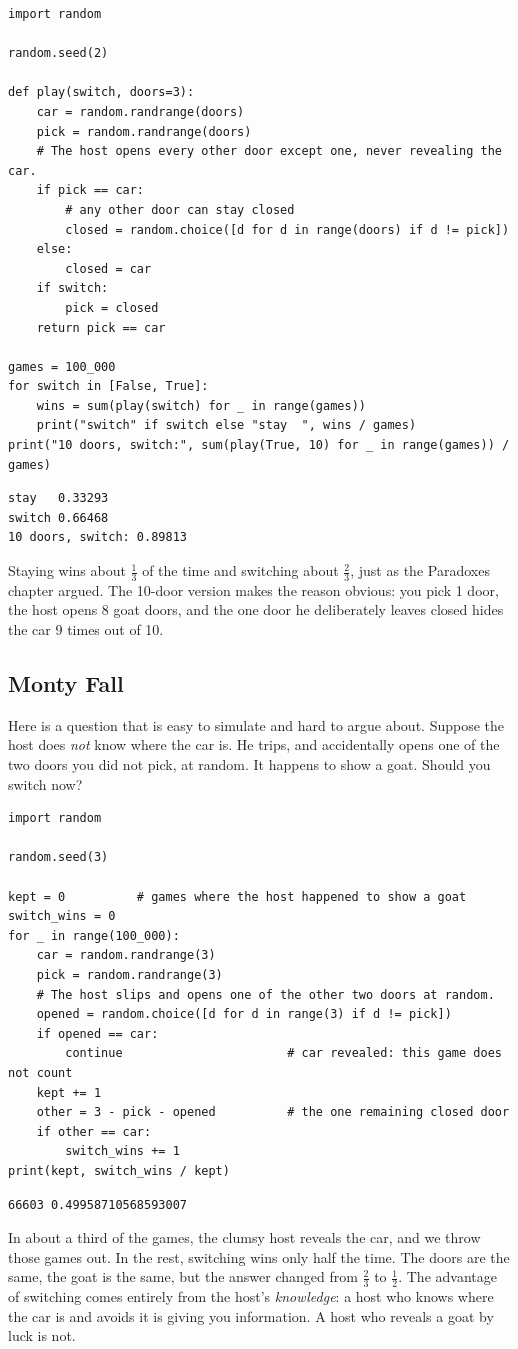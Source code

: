 \begin{verbatim}
import random

random.seed(2)

def play(switch, doors=3):
    car = random.randrange(doors)
    pick = random.randrange(doors)
    # The host opens every other door except one, never revealing the car.
    if pick == car:
        # any other door can stay closed
        closed = random.choice([d for d in range(doors) if d != pick])
    else:
        closed = car
    if switch:
        pick = closed
    return pick == car

games = 100_000
for switch in [False, True]:
    wins = sum(play(switch) for _ in range(games))
    print("switch" if switch else "stay  ", wins / games)
print("10 doors, switch:", sum(play(True, 10) for _ in range(games)) / games)
\end{verbatim}
\begin{verbatim}
stay   0.33293
switch 0.66468
10 doors, switch: 0.89813
\end{verbatim}
Staying wins about $\frac{1}{3}$ of the time and switching about $\frac{2}{3}$, just as
the Paradoxes chapter argued. The 10-door version makes the reason obvious: you pick 1
door, the host opens 8 goat doors, and the one door he deliberately leaves closed hides
the car 9 times out of 10.

\subsection{Monty Fall}
Here is a question that is easy to simulate and hard to argue about. Suppose the host
does \emph{not} know where the car is. He trips, and accidentally opens one of the two
doors you did not pick, at random. It happens to show a goat. Should you switch now?

\begin{verbatim}
import random

random.seed(3)

kept = 0          # games where the host happened to show a goat
switch_wins = 0
for _ in range(100_000):
    car = random.randrange(3)
    pick = random.randrange(3)
    # The host slips and opens one of the other two doors at random.
    opened = random.choice([d for d in range(3) if d != pick])
    if opened == car:
        continue                       # car revealed: this game does not count
    kept += 1
    other = 3 - pick - opened          # the one remaining closed door
    if other == car:
        switch_wins += 1
print(kept, switch_wins / kept)
\end{verbatim}
\begin{verbatim}
66603 0.49958710568593007
\end{verbatim}
In about a third of the games, the clumsy host reveals the car, and we throw those games
out. In the rest, switching wins only half the time. The doors are the same, the goat
is the same, but the answer changed from $\frac{2}{3}$ to $\frac{1}{2}$. The advantage of
switching comes entirely from the host's \emph{knowledge}: a host who knows where the
car is and avoids it is giving you information. A host who reveals a goat by luck is
not.

